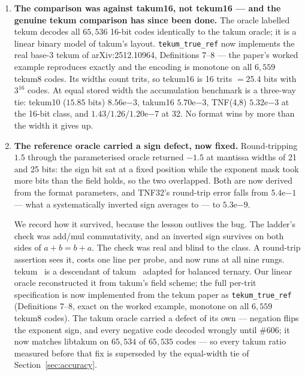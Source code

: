 \documentclass[11pt]{article}
\theoremstyle{definition}
\begin{document}
\begin{enumerate}[leftmargin=*]
\item \textbf{The comparison was against takum16, not tekum16 --- and the
genuine tekum comparison has since been done.} The oracle labelled tekum
decodes all $65{,}536$ 16-bit codes identically to the takum oracle; it is a
linear binary model of takum's layout. \texttt{tekum\_true\_ref} now
implements the real base-3 tekum of arXiv:2512.10964, Definitions 7--8 --- the
paper's worked example reproduces exactly and the encoding is monotone on all
$6{,}559$ tekum8 codes. Its widths count trits, so tekum16 is 16 trits
$= 25.4$ bits with $3^{16}$ codes. At equal stored width the accumulation
benchmark is a three-way tie: tekum10 ($15.85$ bits) $8.56\mathrm{e}{-3}$,
takum16 $5.70\mathrm{e}{-3}$, TNF(4,8) $5.32\mathrm{e}{-3}$ at the 16-bit
class, and $1.43/1.26/1.20\mathrm{e}{-7}$ at 32. No format wins by more than
the width it gives up.

\item \textbf{The reference oracle carried a sign defect, now fixed.} Round-tripping
$1.5$ through the parameterised oracle returned $-1.5$ at mantissa widths of 21
and 25 bits: the sign bit sat at a fixed position while the exponent mask took
more bits than the field holds, so the two overlapped. Both are now derived from
the format parameters, and TNF32's round-trip error falls from
$5.4\mathrm{e}{-1}$ --- what a systematically inverted sign averages to --- to
$5.3\mathrm{e}{-9}$.

We record how it survived, because the lesson outlives the bug. The ladder's
check was add/mul commutativity, and an inverted sign survives on both sides of
$a+b=b+a$. The check was real and blind to the class. A round-trip assertion sees
it, costs one line per probe, and now runs at all nine rungs. tekum~\cite{tekum} is a descendant of takum~\cite{takum} adapted for balanced
ternary. Our
linear oracle reconstructed it from takum's field scheme; the full per-trit
specification is now implemented from the tekum paper as
\texttt{tekum\_true\_ref} (Definitions 7--8, exact on the worked example,
monotone on all $6{,}559$ tekum8 codes). The takum oracle carried a defect of
its own --- negation flips the exponent sign, and every negative code decoded
wrongly until \#606; it now matches libtakum on $65{,}534$ of $65{,}535$ codes
--- so every takum ratio measured before that fix is superseded by the
equal-width tie of Section~\ref{sec:accuracy}.


\end{enumerate}
\end{document}
